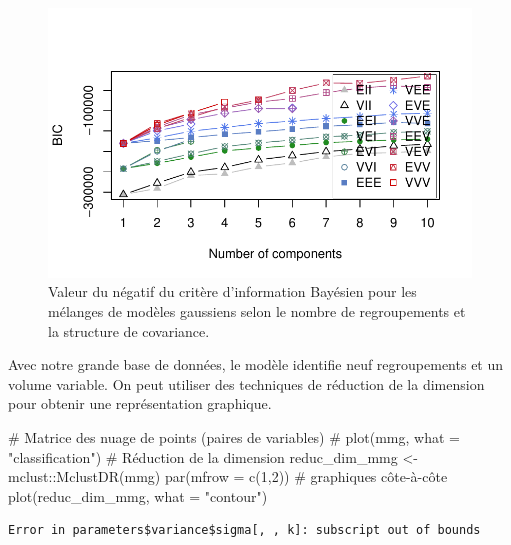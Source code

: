 \documentclass[
  11pt,
  letterpaper,
]{scrbook}
\newenvironment{Shaded}{\begin{snugshade}}{\end{snugshade}}
\newcommand{\AttributeTok}[1]{\textcolor[rgb]{0.40,0.45,0.13}{#1}}
\newcommand{\CommentTok}[1]{\textcolor[rgb]{0.37,0.37,0.37}{#1}}
\newcommand{\DecValTok}[1]{\textcolor[rgb]{0.68,0.00,0.00}{#1}}
\newcommand{\FunctionTok}[1]{\textcolor[rgb]{0.28,0.35,0.67}{#1}}
\newcommand{\NormalTok}[1]{\textcolor[rgb]{0.00,0.23,0.31}{#1}}
\newcommand{\OtherTok}[1]{\textcolor[rgb]{0.00,0.23,0.31}{#1}}
\newcommand{\SpecialCharTok}[1]{\textcolor[rgb]{0.37,0.37,0.37}{#1}}
\newcommand{\StringTok}[1]{\textcolor[rgb]{0.13,0.47,0.30}{#1}}
\theoremstyle{definition}
\theoremstyle{remark}
\begin{document}
\begin{figure}[ht!]

{\centering \includegraphics{regroupements_files/figure-pdf/fig-mclustbic-1.pdf}

}

\caption{\label{fig-mclustbic}Valeur du négatif du critère d'information
Bayésien pour les mélanges de modèles gaussiens selon le nombre de
regroupements et la structure de covariance.}

\end{figure}

Avec notre grande base de données, le modèle identifie neuf
regroupements et un volume variable. On peut utiliser des techniques de
réduction de la dimension pour obtenir une représentation graphique.

\begin{Shaded}
\begin{Highlighting}[]
\CommentTok{\# Matrice des nuage de points (paires de variables)}
\CommentTok{\# plot(mmg, what = "classification")}
\CommentTok{\# Réduction de la dimension}
\NormalTok{reduc\_dim\_mmg }\OtherTok{\textless{}{-}}\NormalTok{ mclust}\SpecialCharTok{::}\FunctionTok{MclustDR}\NormalTok{(mmg)}
\FunctionTok{par}\NormalTok{(}\AttributeTok{mfrow =} \FunctionTok{c}\NormalTok{(}\DecValTok{1}\NormalTok{,}\DecValTok{2}\NormalTok{)) }\CommentTok{\# graphiques côte{-}à{-}côte}
\FunctionTok{plot}\NormalTok{(reduc\_dim\_mmg, }\AttributeTok{what =} \StringTok{"contour"}\NormalTok{)}
\end{Highlighting}
\end{Shaded}

\begin{verbatim}
Error in parameters$variance$sigma[, , k]: subscript out of bounds
\end{verbatim}
\end{document}
